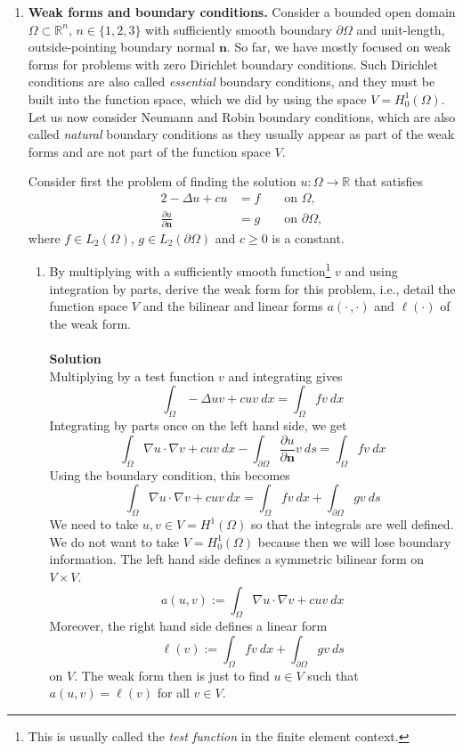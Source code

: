 \documentclass[11pt]{article}
\newcommand{\bs}{\boldsymbol}
\begin{document}
\begin{enumerate}
\item {\bf Weak forms and boundary conditions.}  Consider a bounded
  open domain $\Omega\subset \mathbb R^n$, $n\in\{1,2,3\}$ with
  sufficiently smooth boundary $\partial \Omega$ and unit-length,
  outside-pointing boundary normal $\bs n$. So far, we have mostly
  focused on weak forms for problems with zero Dirichlet boundary
  conditions. Such Dirichlet conditions are also called
  \emph{essential} boundary conditions, and they must be built into
  the function space, which we did by using the space
  $V=H_0^1(\Omega)$. Let us now consider Neumann and Robin boundary
  conditions, which are also called \emph{natural} boundary conditions
  as they usually appear as part of the weak forms and are not part of
  the function space $V$.

  Consider first the problem of finding the solution $u:\Omega\to\mathbb R$
  that satisfies
    \begin{alignat}{2}
      -\Delta u + c u &= f && \text{ on } \Omega,\label{eq:Laplace}\\
      \frac{\partial u}{\partial \bs n} &= g && \text{ on } \partial \Omega,\label{eq:Nbc}
    \end{alignat}
    where $f\in L_2(\Omega)$, $g\in L_2(\partial \Omega)$ and $c\ge 0$
    is a constant.
    \begin{enumerate}
    \item By multiplying with a sufficiently smooth
      function\footnote{This is usually called the \emph{test
          function} in the finite element context.} $v$ and using
      integration by parts, derive the weak form for this problem,
      i.e., detail the function space $V$ and the bilinear and linear
      forms $a(\cdot\,,\cdot)$ and $\ell(\cdot)$ of the weak form.\\
\\
	\textbf{Solution}\\
	Multiplying by a test function $v$ and integrating gives
\[
\int_{\Omega} -\Delta u v + cuv\ dx = \int_{\Omega} fv\ dx
\]
Integrating by parts once on the left hand side, we get
\[
\int_{\Omega} \nabla u \cdot \nabla v + cuv\ dx - \int_{\partial \Omega} \frac{\partial u}{\partial \bs n} v\ ds = \int_{\Omega} fv\ dx
\]
Using the boundary condition, this becomes
\[
 \int_{\Omega} \nabla u \cdot \nabla v  + cuv\ dx = \int_{\Omega} fv\ dx + \int_{\partial \Omega} gv\ ds
\]
We need to take $u,v \in V = H^1(\Omega)$ so that the integrals are well defined.  We do not want to take $V = H_0^1(\Omega)$ because then we will lose boundary information.  The left hand side defines a symmetric bilinear form on $V \times V$.
\[
a(u,v) :=  \int_{\Omega} \nabla u \cdot \nabla v  + cuv\ dx 
\]
Moreover, the right hand side defines a linear form
\[
\ell(v) :=  \int_{\Omega} fv\ dx + \int_{\partial \Omega} gv\ ds
\]
on $V$.  The weak form then is just to find $u\in V$ such that $a(u,v) = \ell(v)$ for all $v\in V$.






\end{enumerate}
\end{enumerate}
\end{document}
